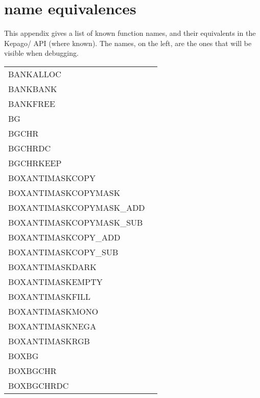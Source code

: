 \chapter[\vas{}-\package{} name equivalences]{\vas{}\textendash\package{} name equivalences}\label{appendix:vasnames}

This appendix gives a list of known \vas{} function names, and their \package{} 
equivalents in the Kepago/\reallive{} API (where known).  The \vas{} names, on 
the left, are the ones that will be visible when debugging.

\ifhevea\else\medskip\fi
{\ttfamily\begin{supertabular}{l@{\hs}l}
  BANKALLOC                 &               \\
  BANKBANK                  &\\
  BANKFREE                  &                \\
  BG                        &             \\
  BGCHR                     &              \\
  BGCHRDC                   &              \\
  BGCHRKEEP                 &\\
  BOXANTIMASKCOPY           &        \\
  BOXANTIMASKCOPYMASK       &    \\
  BOXANTIMASKCOPYMASK\_ADD  &     \\
  BOXANTIMASKCOPYMASK\_SUB  &     \\
  BOXANTIMASKCOPY\_ADD      &         \\
  BOXANTIMASKCOPY\_SUB      &         \\
  BOXANTIMASKDARK           &\\
  BOXANTIMASKEMPTY          &\\
  BOXANTIMASKFILL           &\\
  BOXANTIMASKMONO           &\\
  BOXANTIMASKNEGA           &\\
  BOXANTIMASKRGB            &\\
  BOXBG                     &\\
  BOXBGCHR                  &\\
  BOXBGCHRDC                &\\

\end{supertabular}}
